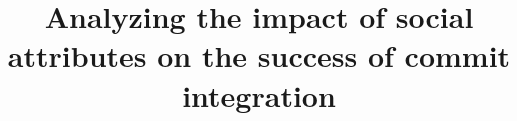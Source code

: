 \documentclass[10pt, conference]{IEEEtran}
\begin{document}
%

\title{Analyzing the impact of social attributes on the success of commit integration}



\author{
\IEEEauthorblockA{\\
\\
\\}

}


% 
\end{document}
